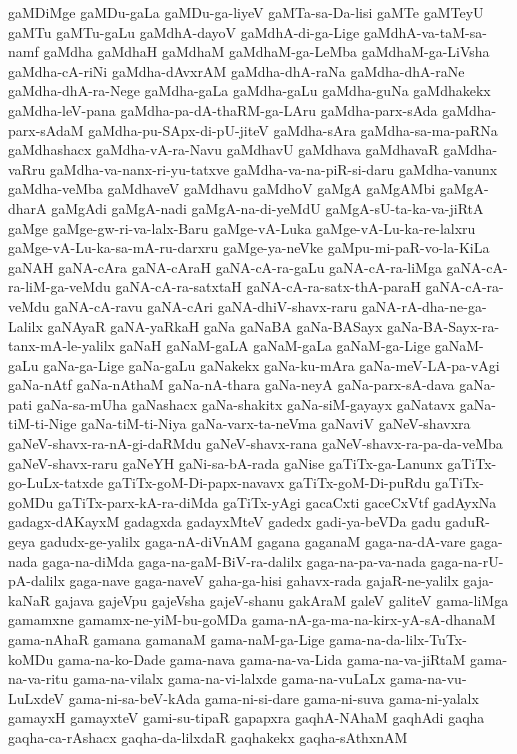 {gaMDiMge
gaMDu-gaLa
gaMDu-ga-liyeV
gaMTa-sa-Da-lisi
gaMTe
gaMTeyU
gaMTu
gaMTu-gaLu
gaMdhA-dayoV
gaMdhA-di-ga-Lige
gaMdhA-va-taM-sa-namf
gaMdha
gaMdhaH
gaMdhaM
gaMdhaM-ga-LeMba
gaMdhaM-ga-LiVsha
gaMdha-cA-riNi
gaMdha-dAvxrAM
gaMdha-dhA-raNa
gaMdha-dhA-raNe
gaMdha-dhA-ra-Nege
gaMdha-gaLa
gaMdha-gaLu
gaMdha-guNa
gaMdhakekx
gaMdha-leV-pana
gaMdha-pa-dA-thaRM-ga-LAru
gaMdha-parx-sAda
gaMdha-parx-sAdaM
gaMdha-pu-SApx-di-pU-jiteV
gaMdha-sAra
gaMdha-sa-ma-paRNa
gaMdhashacx
gaMdha-vA-ra-Navu
gaMdhavU
gaMdhava
gaMdhavaR
gaMdha-vaRru
gaMdha-va-nanx-ri-yu-tatxve
gaMdha-va-na-piR-si-daru
gaMdha-vanunx
gaMdha-veMba
gaMdhaveV
gaMdhavu
gaMdhoV
gaMgA
gaMgAMbi
gaMgA-dharA
gaMgAdi
gaMgA-nadi
gaMgA-na-di-yeMdU
gaMgA-sU-ta-ka-va-jiRtA
gaMge
gaMge-gw-ri-va-lalx-Baru
gaMge-vA-Luka
gaMge-vA-Lu-ka-re-lalxru
gaMge-vA-Lu-ka-sa-mA-ru-darxru
gaMge-ya-neVke
gaMpu-mi-paR-vo-la-KiLa
gaNAH
gaNA-cAra
gaNA-cAraH
gaNA-cA-ra-gaLu
gaNA-cA-ra-liMga
gaNA-cA-ra-liM-ga-veMdu
gaNA-cA-ra-satxtaH
gaNA-cA-ra-satx-thA-paraH
gaNA-cA-ra-veMdu
gaNA-cA-ravu
gaNA-cAri
gaNA-dhiV-shavx-raru
gaNA-rA-dha-ne-ga-Lalilx
gaNAyaR
gaNA-yaRkaH
gaNa
gaNaBA
gaNa-BASayx
gaNa-BA-Sayx-ra-tanx-mA-le-yalilx
gaNaH
gaNaM-gaLA
gaNaM-gaLa
gaNaM-ga-Lige
gaNaM-gaLu
gaNa-ga-Lige
gaNa-gaLu
gaNakekx
gaNa-ku-mAra
gaNa-meV-LA-pa-vAgi
gaNa-nAtf
gaNa-nAthaM
gaNa-nA-thara
gaNa-neyA
gaNa-parx-sA-dava
gaNa-pati
gaNa-sa-mUha
gaNashacx
gaNa-shakitx
gaNa-siM-gayayx
gaNatavx
gaNa-tiM-ti-Nige
gaNa-tiM-ti-Niya
gaNa-varx-ta-neVma
gaNaviV
gaNeV-shavxra
gaNeV-shavx-ra-nA-gi-daRMdu
gaNeV-shavx-rana
gaNeV-shavx-ra-pa-da-veMba
gaNeV-shavx-raru
gaNeYH
gaNi-sa-bA-rada
gaNise
gaTiTx-ga-Lanunx
gaTiTx-go-LuLx-tatxde
gaTiTx-goM-Di-papx-navavx
gaTiTx-goM-Di-puRdu
gaTiTx-goMDu
gaTiTx-parx-kA-ra-diMda
gaTiTx-yAgi
gacaCxti
gaceCxVtf
gadAyxNa
gadagx-dAKayxM
gadagxda
gadayxMteV
gadedx
gadi-ya-beVDa
gadu
gaduR-geya
gadudx-ge-yalilx
gaga-nA-diVnAM
gagana
gaganaM
gaga-na-dA-vare
gaga-nada
gaga-na-diMda
gaga-na-gaM-BiV-ra-dalilx
gaga-na-pa-va-nada
gaga-na-rU-pA-dalilx
gaga-nave
gaga-naveV
gaha-ga-hisi
gahavx-rada
gajaR-ne-yalilx
gaja-kaNaR
gajava
gajeVpu
gajeVsha
gajeV-shanu
gakAraM
galeV
galiteV
gama-liMga
gamamxne
gamamx-ne-yiM-bu-goMDa
gama-nA-ga-ma-na-kirx-yA-sA-dhanaM
gama-nAhaR
gamana
gamanaM
gama-naM-ga-Lige
gama-na-da-lilx-TuTx-koMDu
gama-na-ko-Dade
gama-nava
gama-na-va-Lida
gama-na-va-jiRtaM
gama-na-va-ritu
gama-na-vilalx
gama-na-vi-lalxde
gama-na-vuLaLx
gama-na-vu-LuLxdeV
gama-ni-sa-beV-kAda
gama-ni-si-dare
gama-ni-suva
gama-ni-yalalx
gamayxH
gamayxteV
gami-su-tipaR
gapapxra
gaqhA-NAhaM
gaqhAdi
gaqha
gaqha-ca-rAshacx
gaqha-da-lilxdaR
gaqhakekx
gaqha-sAthxnAM
}
